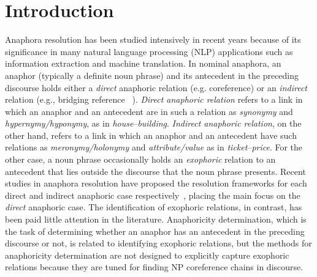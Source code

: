 \documentclass[english]{jnlp_1.4}
\begin{document}
\maketitle

\section{Introduction}

Anaphora resolution has been studied intensively in recent years
because of its significance in many natural language processing (NLP)
applications such as information extraction and machine
translation. In nominal anaphora, an anaphor (typically a definite
noun phrase) and its antecedent in the preceding discourse holds
either a \emph{direct} anaphoric relation (e.g. coreference) or an
\emph{indirect} relation (e.g., bridging reference
~). \emph{Direct anaphoric relation} refers
to a link in which an anaphor and an antecedent are in such a relation as
\emph{synonymy} and \emph{hypernymy/hyponymy}, as in
\emph{house}--\emph{building}. \emph{Indirect anaphoric relation}, on
the other hand, refers to a link in which an anaphor and an antecedent
have such relations as \emph{meronymy/holonymy} and
\emph{attribute/value} as in \emph{ticket}--\emph{price}. For the
other case, a noun phrase occasionally holds an \emph{exophoric} relation
to an antecedent that lies outside the discourse that the noun
phrase presents. Recent studies in anaphora resolution have 
proposed the resolution frameworks for each direct and indirect
anaphoric case
respectively~, placing
the main focus on the \emph{direct} anaphoric case. The identification of
exophoric relations, in contrast, has been paid little attention in
the literature. Anaphoricity determination, which is the task of
determining whether an anaphor has an antecedent in the preceding
discourse or not, is related to identifying exophoric relations, but
the methods for anaphoricity determination are not designed to
explicitly capture exophoric relations because they are tuned for
finding NP coreference chains in discourse.
\end{document}
